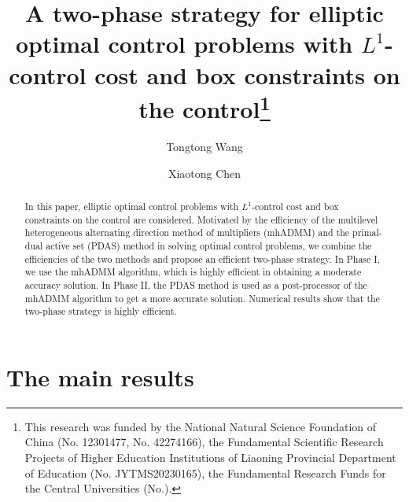 \documentclass[12pt]{llncs}
\begin{document}
\fi
%
\title{A two-phase strategy for elliptic optimal control problems with $L^1$-control cost and box constraints 	on the control\thanks{This research was funded by the National Natural Science Foundation of China (No. 12301477, No. 42274166), the Fundamental Scientific Research Projects of Higher Education Institutions of Liaoning Provincial Department of Education (No. JYTMS20230165), the Fundamental Research Funds for the Central Universities (No.).
}}
\author{Tongtong Wang  \and Xiaotong Chen
}

\maketitle

\begin{abstract}
 In this paper, elliptic optimal control problems with $L^1$-control cost and box constraints
on the control are considered. 
Motivated by the efficiency of the multilevel heterogeneous alternating direction method of multipliers (mhADMM) and the primal-dual active set (PDAS) method in solving optimal control problems, we combine the efficiencies of the two methods and propose an efficient
two-phase strategy. In Phase I, we use the mhADMM algorithm, which is highly efficient in obtaining a moderate accuracy solution. In Phase II, the PDAS method is used as a post-processor of the mhADMM algorithm to get a more accurate solution.  Numerical results show that the two-phase strategy is highly efficient.

\end{abstract}
  
\section{The main results}
\end{document}
